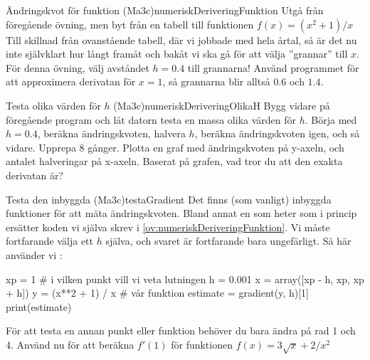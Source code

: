\begin{matteovning}{Ändringskvot för funktion (Ma3c)}{numeriskDeriveringFunktion}
Utgå från föregående övning, men byt från en tabell till funktionen $f(x) = (x^2 + 1) / x$
\newline
\newline
Till skillnad från ovanstående tabell, där vi jobbade med hela årtal, så är det nu inte självklart hur långt framåt och bakåt vi ska gå för att välja ''grannar'' till $x$. För denna övning, välj avståndet $h=0.4$ till grannarna! Använd programmet för att approximera derivatan för $x=1$, så grannarna blir alltså $0.6$ och $1.4$.
\end{matteovning}

\begin{matteovningm}{Testa olika värden för $h$ (Ma3c)}{numeriskDeriveringOlikaH}
Bygg vidare på föregående program och låt datorn testa en massa olika värden för $h$. Börja med $h=0.4$, beräkna ändringskvoten, halvera $h$, beräkna ändringskvoten igen, och så vidare. Upprepa 8 gånger. Plotta en graf med ändringskvoten på y-axeln, och antalet halveringar på x-axeln. Baserat på grafen, vad tror du att den exakta derivatan är?
\end{matteovningm}

\begin{matteovning}{Testa den inbyggda  (Ma3c)}{testaGradient}
Det finns (som vanligt) inbyggda funktioner för att mäta ändringskvoten. Bland annat en som heter  som i princip ersätter koden vi själva skrev i \autoref{ov:numeriskDeriveringFunktion}. Vi måste fortfarande välja ett $h$ själva, och svaret är fortfarande bara ungefärligt. Så här använder vi :
\vspace{0pt}
\begin{python}
xp = 1 # i vilken punkt vill vi veta lutningen
h = 0.001
x = array([xp - h, xp, xp + h])
y = (x**2 + 1) / x # vår funktion
estimate = gradient(y, h)[1]
print(estimate)
\end{python}

För att testa en annan punkt eller funktion behöver du bara ändra på rad 1 och 4.
\newline
\newline
Använd nu  för att beräkna $f'(1)$ för funktionen $f(x) = 3 \sqrt{x} + 2 / x^2$
\end{matteovning}
\newpage

